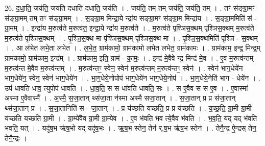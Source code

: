 \documentclass[17pt]{extarticle}
\begin{document}
26. द॒धा॒ति॒ जय॑ति॒ जय॑ति दधाति दधाति॒ जय॑ति । . जय॑ति॒ तम् तम् जय॑ति॒ जय॑ति॒ तम् । . तꣳ स॑ङ्ग्रा॒मꣳ स॑ङ्ग्रा॒मम् तम् तꣳ स॑ङ्ग्रा॒मम् । . स॒ङ्ग्रा॒म मिन्द्रा॒ये न्द्रा॑य सङ्ग्रा॒मꣳ स॑ङ्ग्रा॒म मिन्द्रा॑य । . स॒ङ्ग्रा॒ममिति॑ सं - ग्रा॒मम् । . इन्द्रा॑य म॒रुत्व॑ते म॒रुत्व॑त॒ इन्द्रा॒ये न्द्रा॑य म॒रुत्व॑ते । . म॒रुत्व॑ते पृश्ञिस॒क्थम् पृ॑श्ञिस॒क्थम् म॒रुत्व॑ते म॒रुत्व॑ते पृश्ञिस॒क्थम् । . पृ॒श्ञि॒स॒क्थ मा पृ॑श्ञिस॒क्थम् पृ॑श्ञिस॒क्थ मा । . पृ॒श्ञि॒स॒क्थमिति॑ पृश्ञि - स॒क्थम् । . आ ल॑भेत लभे॒ता ल॑भेत । . ल॒भे॒त॒ ग्राम॑कामो॒ ग्राम॑कामो लभेत लभेत॒ ग्राम॑कामः । . ग्राम॑काम॒ इन्द्र॒ मिन्द्र॒म् ग्राम॑कामो॒ ग्राम॑काम॒ इन्द्र᳚म् । . ग्राम॑काम॒ इति॒ ग्राम॑ - का॒मः॒ । . इन्द्र॑ मे॒वैवे न्द्र॒ मिन्द्र॑ मे॒व । . ए॒व म॒रुत्व॑न्तम् म॒रुत्व॑न्त मे॒वैव म॒रुत्व॑न्तम् । . म॒रुत्व॑न्तꣳ॒॒ स्वेन॒ स्वेन॑ म॒रुत्व॑न्तम् म॒रुत्व॑न्तꣳ॒॒ स्वेन॑ । . स्वेन॑ भाग॒धेये॑न भाग॒धेये॑न॒ स्वेन॒ स्वेन॑ भाग॒धेये॑न । . भा॒ग॒धेये॒नोपोप॑ भाग॒धेये॑न भाग॒धेये॒नोप॑ । . भा॒ग॒धेये॒नेति॑ भाग - धेये॑न । . उप॑ धावति धाव॒ त्युपोप॑ धावति । . धा॒व॒ति॒ स स धा॑वति धावति॒ सः । . स ए॒वैव स स ए॒व । . ए॒वास्मा॑ अस्मा ए॒वैवास्मै᳚ । . अ॒स्मै॒ स॒जा॒तान् थ्स॑जा॒ता न॑स्मा अस्मै सजा॒तान् । . स॒जा॒तान् प्र प्र स॑जा॒तान् थ्स॑जा॒तान् प्र । . स॒जा॒तानिति॑ स - जा॒तान् । . प्र य॑च्छति यच्छति॒ प्र प्र य॑च्छति । . य॒च्छ॒ति॒ ग्रा॒मी ग्रा॒मी य॑च्छति यच्छति ग्रा॒मी । . ग्रा॒म्ये॑वैव ग्रा॒मी ग्रा॒म्ये॑व । . ए॒व भ॑वति भव त्ये॒वैव भ॑वति । . भ॒व॒ति॒ यद् यद् भ॑वति भवति॒ यत् । . यदृ॑ष॒भ ऋ॑ष॒भो यद् यदृ॑ष॒भः । . ऋ॒ष॒भ स्तेन॒ तेन॑ र्.ष॒भ ऋ॑ष॒भ स्तेन॑ । . तेनै॒न्द्र ऐ॒न्द्रस् तेन॒ तेनै॒न्द्रः । \newline
\end{document}
